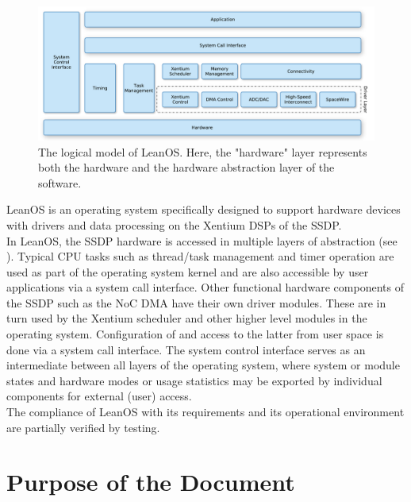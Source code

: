 \begin{figure}[htb]
\begin{center}
	\includegraphics[width=\columnwidth]{../requirements/images/OS_logical}
	\caption{The logical model of LeanOS. Here, the "hardware" layer
	represents both the hardware and the hardware abstraction layer of
	the software.}
	\label{fig:logical_model}
\end{center}
\end{figure}

\noindent
LeanOS\cite{ssdpOS}\cite{leanosADD}\cite{leanosSRS} is an operating system specifically
designed to support hardware devices with drivers and data processing on the
\gls{Xentium} \glspl{DSP} of the \gls{SSDP}.\\

In LeanOS, the \gls{SSDP} hardware is accessed in multiple layers of
abstraction (see ). Typical \gls{CPU} tasks such as
thread/task management and timer operation are used as part of the operating
system kernel and are also accessible by user applications via a system call
interface.  Other functional hardware components of the \gls{SSDP} such as the
\gls{NoC} \gls{DMA} have their own driver modules. These are in turn used by
the \gls{Xentium} scheduler and other higher level modules in the operating
system.  Configuration of and access to the latter from user space is done via
a system call interface. The system control interface serves as an intermediate
between all layers of the operating system, where system or module states and
hardware modes or usage statistics may be exported by individual components for
external (user) access. \\

\noindent
The compliance of LeanOS with its requirements and its operational environment
are partially verified by testing.


\section{Purpose of the Document}

